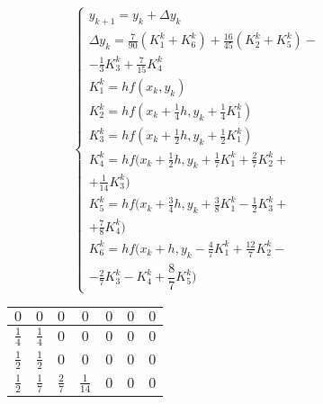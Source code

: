 \begin{figure}
    \begin{minipage}[t]{8.5cm}
        {\small
        \begin{equation*}
            \begin{cases}
                y_{k + 1} = y_k + \Delta y_k\\
                \Delta y_k = \frac{7}{90} (K_1^k + K_6^k) + \frac{16}{45} (K_2^k + K_5^k) -\\
                - \frac{1}{3}K_3^k + \frac{7}{15}K_4^k\\
                K_1^k = hf(x_k, y_k)\\
                K_2^k = hf(x_k + \frac{1}{4}h, y_k + \frac{1}{4}K_1^k)\\
                K_3^k = hf(x_k + \frac{1}{2}h, y_k + \frac{1}{2}K_1^k)\\
                K_4^k = hf(x_k + \frac{1}{2}h, y_k + \frac{1}{7}K_1^k + \frac{2}{7}K_2^k +\\
                + \frac{1}{14}K_3^k)\\
                K_5^k = hf(x_k + \frac{3}{4}h, y_k + \frac{3}{8}K_1^k - \frac{1}{2}K_3^k +\\
                + \frac{7}{8}K_4^k)\\
                K_6^k = hf(x_k + h, y_k - \frac{4}{7}K_1^k + \frac{12}{7}K_2^k -\\
                - \frac{2}{7}K_3^k - K_4^k + \dfrac{8}{7}K_5^k)
            \end{cases}
        \end{equation*}
        }
    \end{minipage}
    \begin{minipage}[t]{7.5cm}
        \begin{table}    
            \begin{tabular}{|c|c|c|c|c|c|c|}
            \hline
            $0$ & $0$ & $0$ & $0$ & $0$ & $0$ & $0$\\
            \hline
            $\frac{1}{4}$ & $\frac{1}{4}$ & $0$ & $0$ & $0$ & $0$ & $0$\\
            \hline
            $\frac{1}{2}$ & $\frac{1}{2}$ & $0$ & $0$ & $0$ & $0$ & $0$\\
            \hline
            $\frac{1}{2}$ & $\frac{1}{7}$ & $\frac{2}{7}$ & $\frac{1}{14}$ & $0$ & $0$ & $0$\\
            \hline

\end{tabular}
\end{table}
\end{minipage}
\end{figure}
